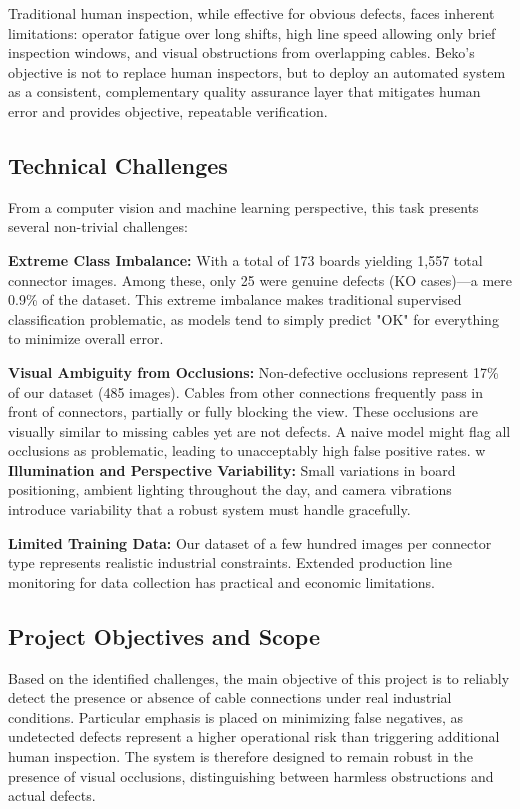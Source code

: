 \documentclass[11pt,a4paper,draft]{article}
\begin{document}
Traditional human inspection, while effective for obvious defects, faces inherent limitations: operator fatigue over long shifts, high line speed allowing only brief inspection windows, and visual obstructions from overlapping cables. Beko's objective is not to replace human inspectors, but to deploy an automated system as a consistent, complementary quality assurance layer that mitigates human error and provides objective, repeatable verification.

\subsection{Technical Challenges}

From a computer vision and machine learning perspective, this task presents several non-trivial challenges:

\textbf{Extreme Class Imbalance:} With a total of 173 boards yielding 1,557 total connector images. Among these, only 25 were genuine defects (KO cases)—a mere 0.9\% of the dataset. This extreme imbalance makes traditional supervised classification problematic, as models tend to simply predict "OK" for everything to minimize overall error.

\textbf{Visual Ambiguity from Occlusions:} Non-defective occlusions represent 17\% of our dataset (485 images). Cables from other connections frequently pass in front of connectors, partially or fully blocking the view. These occlusions are visually similar to missing cables yet are not defects. A naive model might flag all occlusions as problematic, leading to unacceptably high false positive rates.
w
\textbf{Illumination and Perspective Variability:} Small variations in board positioning, ambient lighting throughout the day, and camera vibrations introduce variability that a robust system must handle gracefully.

\textbf{Limited Training Data:} Our dataset of a few hundred images per connector type represents realistic industrial constraints. Extended production line monitoring for data collection has practical and economic limitations.

\subsection{Project Objectives and Scope}

Based on the identified challenges, the main objective of this project is to reliably detect the presence or absence of cable connections under real industrial conditions. Particular emphasis is placed on minimizing false negatives, as undetected defects represent a higher operational risk than triggering additional human inspection. The system is therefore designed to remain robust in the presence of visual occlusions, distinguishing between harmless obstructions and actual defects. 
\end{document}
